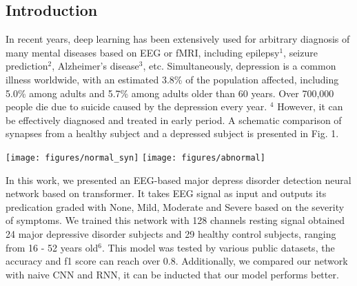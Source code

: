 \documentclass[a0,portrait]{a0poster}
\begin{document}
\begin{minipage}[c]{\linewidth}
\begin{framed}
\begin{multicols}{2}
\section*{Introduction}
In recent years, deep learning has been extensively used for arbitrary diagnosis of many mental diseases based on EEG or fMRI, including epilepsy$^1$, seizure prediction$^2$, Alzheimer's disease$^3$, etc. Simultaneously, depression is a common illness worldwide, with an estimated 3.8\% of the population affected, including 5.0\% among adults and 5.7\% among adults older than 60 years. Over 700,000 people die due to suicide caused by the depression every year. $^4$  However, it can be effectively diagnosed and treated in early period. A schematic comparison of synapses from a healthy subject and a depressed subject is presented in Fig. 1.\\
\begin{center}
\hspace*{\fill}
\texttt{[image: figures/normal\_syn]}
\texttt{[image: figures/abnormal]}
\label{IGSMap}
\end{center}
In this work, we presented an EEG-based major depress disorder detection neural network based on transformer. It takes EEG signal as input and outputs its predication graded with None, Mild, Moderate and Severe based on the severity of symptoms. We trained this network with 128 channels resting signal obtained 24 major depressive disorder subjects and 29 healthy control subjects, ranging from 16 - 52 years old$^6$. This model was tested by various public datasets, the accuracy and f1 score can reach over 0.8. Additionally, we compared our network with naive CNN and RNN, it can be inducted that our model performs better.
\color{Black}

\end{multicols}
\end{framed}
\end{minipage}
\end{document}

